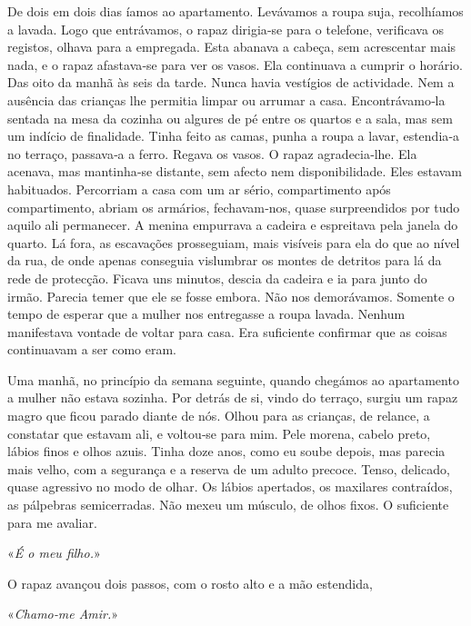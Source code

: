 De dois em dois dias íamos ao apartamento. Levávamos a roupa suja,
recolhíamos a lavada. Logo que entrávamos, o rapaz dirigia­‑se para o
telefone, verificava os registos, olhava para a empregada. Esta abanava
a cabeça, sem acrescentar mais nada, e o rapaz afastava­‑se para ver os
vasos. Ela continuava a cumprir o horário. Das oito da manhã às seis da
tarde. Nunca havia vestígios de actividade. Nem a ausência das crianças
lhe permitia limpar ou arrumar a casa. Encontrávamo­‑la sentada na mesa
da cozinha ou algures de pé entre os quartos e a sala, mas sem um
indício de finalidade. Tinha feito as camas, punha a roupa a lavar,
estendia­‑a no terraço, passava­‑a a ferro. Regava os vasos. O rapaz
agradecia­‑lhe. Ela acenava, mas mantinha­‑se distante, sem afecto nem
disponibilidade. Eles estavam habituados. Percorriam a casa com um ar
sério, compartimento após compartimento, abriam os armários,
fechavam­‑nos, quase surpreendidos por tudo aquilo ali permanecer. A
menina empurrava a cadeira e espreitava pela janela do quarto. Lá fora,
as escavações prosseguiam, mais visíveis para ela do que ao nível da
rua, de onde apenas conseguia vislumbrar os montes de detritos para lá
da rede de protecção. Ficava uns minutos, descia da cadeira e ia para
junto do irmão. Parecia temer que ele se fosse embora. Não nos
demorávamos. Somente o tempo de esperar que a mulher nos entregasse a
roupa lavada. Nenhum manifestava vontade de voltar para casa. Era
suficiente confirmar que as coisas continuavam a ser como eram.

Uma manhã, no princípio da semana seguinte, quando chegámos ao
apartamento a mulher não estava sozinha. Por detrás de si, vindo do
terraço, surgiu um rapaz magro que ficou parado diante de nós. Olhou
para as crianças, de relance, a constatar que estavam ali, e voltou­‑se
para mim. Pele morena, cabelo preto, lábios finos e olhos azuis. Tinha
doze anos, como eu soube depois, mas parecia mais velho, com a segurança
e a reserva de um adulto precoce. Tenso, delicado, quase agressivo no
modo de olhar. Os lábios apertados, os maxilares contraídos, as
pálpebras semicerradas. Não mexeu um músculo, de olhos fixos. O
suficiente para me avaliar.

«\emph{É o meu filho.}»

O rapaz avançou dois passos, com o rosto alto e a mão estendida,

«\emph{Chamo­‑me Amir.}»

